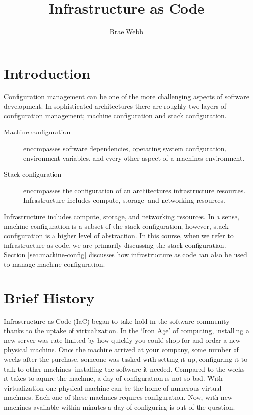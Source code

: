 \title{Infrastructure as Code}
\author{Brae Webb}
\date{}

\maketitle

\section{Introduction}
Configuration management can be one of the more challenging aspects of software development.
In sophisticated architectures there are roughly two layers of configuration management;
machine configuration and stack configuration.

\begin{description}
    \item[Machine configuration] encompasses software dependencies, operating system configuration, environment variables,
    and every other aspect of a machines environment.
    \item[Stack configuration] encompasses the configuration of an architectures infrastructure resources.
    Infrastructure includes compute, storage, and networking resources.
\end{description}

Infrastructure includes compute, storage, and networking resources.
In a sense, machine configuration is a subset of the stack configuration, however,
stack configuration is a higher level of abstraction.
In this course, when we refer to infrastructure as code,
we are primarily discussing the stack configuration.
Section \ref{sec:machine-config} discusses how infrastructure as code can also be used to manage machine configuration.

\section{Brief History}
Infrastructure as Code (IaC) began to take hold in the software community thanks to the uptake of virtualization.
In the `Iron Age' of computing, installing a new server was rate limited by how quickly you could shop for and order a new physical machine.
Once the machine arrived at your company, some number of weeks after the purchase,
someone was tasked with setting it up, configuring it to talk to other machines, installing the software it needed.
Compared to the weeks it takes to aquire the machine, a day of configuration is not so bad.
With virtualization one physical machine can be the home of numerous virtual machines.
Each one of these machines requires configuration.
Now, with new machines available within minutes a day of configuring is out of the question.

